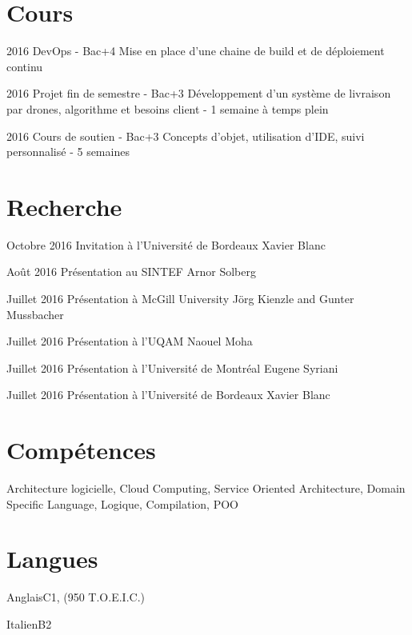 \documentclass{tccv}
\begin{document}
\section{Cours}

\begin{yearlist}

\item{2016}
     {DevOps - Bac+4}
     {Mise en place d'une chaine de build et de d\'eploiement continu}

\item{2016}
     {Projet fin de semestre - Bac+3}
     {D\'eveloppement d'un syst\`eme de livraison par drones, algorithme et besoins client - 1 semaine \`a temps plein}

\item{2016}
     {Cours de soutien  - Bac+3}
     {Concepts d'objet, utilisation d'IDE, suivi personnalis\'e - 5 semaines}

\end{yearlist}

\section{Recherche}

\begin{yearlist}
      
\item{Octobre 2016}
     {Invitation \`a l'Universit\'e de Bordeaux}
     {Xavier Blanc}
      
\item{Ao\^ut 2016}
     {Pr\'esentation au SINTEF}
     {Arnor Solberg}

\item{Juillet 2016}
     {Pr\'esentation \`a McGill University}
     {J\"org Kienzle and Gunter Mussbacher}

\item{Juillet 2016}
     {Pr\'esentation \`a l'UQAM}
     {Naouel Moha}

\item{Juillet 2016}
     {Pr\'esentation \`a l'Universit\'e de Montr\'eal}
     {Eugene Syriani}
     
\item{Juillet 2016}
     {Pr\'esentation \`a l'Universit\'e de Bordeaux}
     {Xavier Blanc}     

\end{yearlist}
\vspace{-6pt} %

\section{Comp\'etences}
Architecture logicielle, Cloud Computing, Service Oriented Architecture, Domain Specific Language, Logique, Compilation, POO


\section{Langues}

\begin{factlist}
\item{Anglais}{C1, (950 T.O.E.I.C.)}
\item{Italien}{B2}
\end{factlist}
\end{document}
